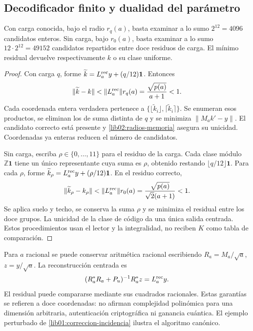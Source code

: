\subsection{Decodificador finito y dualidad del parámetro}
\label{lib02:computacion}

\begin{proposition}
\label{lib02:decodificador}
Con carga conocida, bajo el radio \(r_q(a)\), basta examinar a lo
sumo \(2^{12}=4096\) candidatos enteros. Sin carga, bajo
\(r_0(a)\), basta examinar a lo sumo \(12\cdot2^{12}=49152\)
candidatos repartidos entre doce residuos de carga. El mínimo residual
devuelve respectivamente \(k\) o su clase uniforme.
\end{proposition}
\begin{proof}
Con carga \(q\), forme
\(\widetilde k=L_a^{\rm rec}y+(q/12)\mathbf1\). Entonces
\[
 \|\widetilde k-k\|
 <\|L_a^{\rm rec}\|r_q(a)
 =\frac{\sqrt{p(a)}}{a+1}<1.
\]
Cada coordenada entera verdadera pertenece a
\(\{\lfloor\widetilde k_i\rfloor,
\lceil\widetilde k_i\rceil\}\). Se enumeran esos productos,
se eliminan los de suma distinta de \(q\) y se minimiza
\(\|M_ak'-y\|\). El candidato correcto está presente y
\cref{lib02:radios-memoria} asegura su unicidad. Coordenadas ya enteras
reducen el número de candidatos.

Sin carga, escriba \(\rho\in\{0,\ldots,11\}\) para el residuo
de la carga. Cada clase módulo \(\mathbb Z\mathbf1\) tiene un
único representante cuya suma es \(\rho\), obtenido restando
\(\lfloor q/12\rfloor\mathbf1\). Para cada \(\rho\), forme
\(\widetilde k_\rho=L_a^{\rm rec}y+(\rho/12)\mathbf1\).
En el residuo correcto,
\[
 \|\widetilde k_\rho-k_\rho\|
 <\|L_a^{\rm rec}\|r_0(a)
 =\frac{\sqrt{p(a)}}{\sqrt2(a+1)}<1.
\]
Se aplica suelo y techo, se conserva la suma \(\rho\) y se minimiza
el residual entre los doce grupos. La unicidad de la clase de código
da una única salida centrada. Estos procedimientos usan el lector y la
integralidad, no reciben \(K\) como tabla de comparación.
\end{proof}

Para \(a\) racional se puede conservar aritmética racional escribiendo
\(R_a=M_a/\sqrt a\), \(z=y/\sqrt a\). La reconstrucción centrada
es
\[
 (R_a^*R_a+P_u)^{-1}R_a^*z=L_a^{\rm rec}y.
\]
El residual puede compararse mediante sus cuadrados racionales. Estas
garantías se refieren a doce coordenadas: no afirman complejidad
polinómica para una dimensión arbitraria, autenticación criptográfica ni
ganancia cuántica. El ejemplo perturbado de
\cref{lib01:correccion-incidencia} ilustra el algoritmo canónico.

